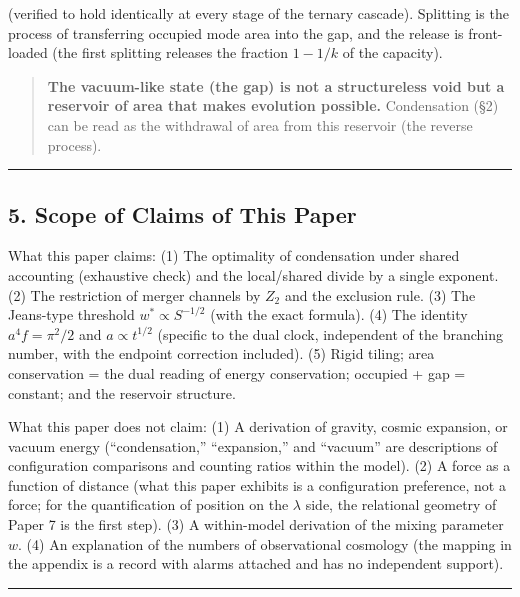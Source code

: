 \documentclass[
]{article}
\begin{document}
(verified to hold identically at every stage of the ternary cascade).
Splitting is the process of transferring occupied mode area into the
gap, and the release is front-loaded (the first splitting releases the
fraction \(1-1/k\) of the capacity).

\begin{quote}
\textbf{The vacuum-like state (the gap) is not a structureless void but
a reservoir of area that makes evolution possible.} Condensation (§2)
can be read as the withdrawal of area from this reservoir (the reverse
process).
\end{quote}

\begin{center}\rule{0.5\linewidth}{0.5pt}\end{center}

\subsection{5. Scope of Claims of This
Paper}\label{scope-of-claims-of-this-paper}

What this paper claims: (1) The optimality of condensation under shared
accounting (exhaustive check) and the local/shared divide by a single
exponent. (2) The restriction of merger channels by \(Z_2\) and the
exclusion rule. (3) The Jeans-type threshold \(w^*\propto S^{-1/2}\)
(with the exact formula). (4) The identity \(a^4f=\pi^2/2\) and
\(a\propto t^{1/2}\) (specific to the dual clock, independent of the
branching number, with the endpoint correction included). (5) Rigid
tiling; area conservation = the dual reading of energy conservation;
occupied + gap = constant; and the reservoir structure.

What this paper does not claim: (1) A derivation of gravity, cosmic
expansion, or vacuum energy (``condensation,'' ``expansion,'' and
``vacuum'' are descriptions of configuration comparisons and counting
ratios within the model). (2) A force as a function of distance (what
this paper exhibits is a configuration preference, not a force; for the
quantification of position on the \(\lambda\) side, the relational
geometry of Paper 7 is the first step). (3) A within-model derivation of
the mixing parameter \(w\). (4) An explanation of the numbers of
observational cosmology (the mapping in the appendix is a record with
alarms attached and has no independent support).

\begin{center}\rule{0.5\linewidth}{0.5pt}\end{center}
\end{document}
